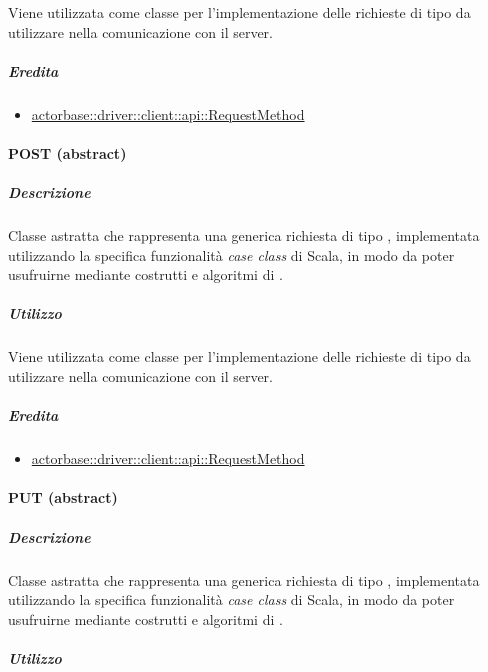 \documentclass{scalatekids-article}
\begin{document}
Viene utilizzata come classe per l'implementazione delle richieste 
di tipo  da utilizzare nella comunicazione con il server.

\subparagraph{Eredita}

\begin{itemize}
\item \hyperref[sec:actorbase::driver::client::api::RequestMethod]{actorbase::driver::client::api::RequestMethod}
\end{itemize}


\paragraph{POST (abstract)}
\label{sec:actorbase::driver::client::api::POST}

\subparagraph{Descrizione}

Classe astratta che rappresenta una generica richiesta  di tipo
, implementata utilizzando la specifica funzionalità \textit{case
  class} di Scala, in modo da poter usufruirne mediante costrutti e algoritmi di
.

\subparagraph{Utilizzo}

Viene utilizzata come classe per l'implementazione delle richieste 
di tipo  da utilizzare nella comunicazione con il server.

\subparagraph{Eredita}

\begin{itemize}
\item \hyperref[sec:actorbase::driver::client::api::RequestMethod]{actorbase::driver::client::api::RequestMethod}
\end{itemize}


\paragraph{PUT (abstract)}
\label{sec:actorbase::driver::client::api::PUT}

\subparagraph{Descrizione}

Classe astratta che rappresenta una generica richiesta  di tipo
, implementata utilizzando la specifica funzionalità \textit{case
  class} di Scala, in modo da poter usufruirne mediante costrutti e algoritmi di
.

\subparagraph{Utilizzo}
\end{document}
